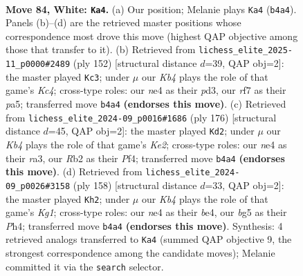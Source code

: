 \documentclass[11pt]{article}
\begin{document}
\clearpage

\begin{figure}[p]\centering
\begin{subfigure}{0.46\textwidth}\centering
\resizebox{\linewidth}{!}{%
\newchessgame
\chessboard[
  setfen={8/5r2/1B2k2p/3pp1b1/1K2n2p/8/1R6/8 w - - 2 84},
  showmover=false,
  pgfstyle=straightmove, color=movearrow, markmove={b4-a4}
]}
\caption{}
\end{subfigure}\hfill
\begin{subfigure}{0.46\textwidth}\centering
\resizebox{\linewidth}{!}{%
\newchessgame
\chessboard[
  setfen={4B3/7p/1b6/p5p1/2K1pk2/3p3P/8/8 w - - 0 77},
  showmover=false,
  pgfstyle=straightmove, color=movearrow, markmove={c4-c3}
]}
\caption{}
\end{subfigure}
\\[4pt]
\begin{subfigure}{0.46\textwidth}\centering
\resizebox{\linewidth}{!}{%
\newchessgame
\chessboard[
  setfen={8/6kp/2B5/2p2b2/1pP2P2/r7/4K3/8 w - - 4 89},
  showmover=false,
  pgfstyle=straightmove, color=movearrow, markmove={e2-d2}
]}
\caption{}
\end{subfigure}\hfill
\begin{subfigure}{0.46\textwidth}\centering
\resizebox{\linewidth}{!}{%
\newchessgame
\chessboard[
  setfen={8/8/6p1/4nk1p/4bp1P/8/8/R5K1 w - - 0 80},
  showmover=false,
  pgfstyle=straightmove, color=movearrow, markmove={g1-h2}
]}
\caption{}
\end{subfigure}
\caption{\textbf{Move 84, White: \texttt{Ka4}.} (a) Our position; Melanie plays \texttt{Ka4} (\texttt{b4a4}). Panels (b)--(d) are the retrieved master positions whose correspondence most drove this move (highest QAP objective among those that transfer to it). (b) Retrieved from \texttt{lichess\_elite\_2025-11\_p0000\#2489} (ply 152) [structural distance $d$=39, QAP obj=2]: the master played \texttt{Kc3}; under $\mu$ our \emph{Kb4} plays the role of that game's \emph{Kc4}; cross-type roles: our \emph{n}e4 as their \emph{p}d3, our \emph{r}f7 as their \emph{p}a5; transferred move \texttt{b4a4} \textbf{(endorses this move)}. (c) Retrieved from \texttt{lichess\_elite\_2024-09\_p0016\#1686} (ply 176) [structural distance $d$=45, QAP obj=2]: the master played \texttt{Kd2}; under $\mu$ our \emph{Kb4} plays the role of that game's \emph{Ke2}; cross-type roles: our \emph{n}e4 as their \emph{r}a3, our \emph{R}b2 as their \emph{P}f4; transferred move \texttt{b4a4} \textbf{(endorses this move)}. (d) Retrieved from \texttt{lichess\_elite\_2024-09\_p0026\#3158} (ply 158) [structural distance $d$=33, QAP obj=2]: the master played \texttt{Kh2}; under $\mu$ our \emph{Kb4} plays the role of that game's \emph{Kg1}; cross-type roles: our \emph{n}e4 as their \emph{b}e4, our \emph{b}g5 as their \emph{P}h4; transferred move \texttt{b4a4} \textbf{(endorses this move)}. Synthesis: 4 retrieved analogs transferred to \texttt{Ka4} (summed QAP objective 9, the strongest correspondence among the candidate moves); Melanie committed it via the \texttt{search} selector.}
\label{fig:thought-m166}
\end{figure}
\end{document}
